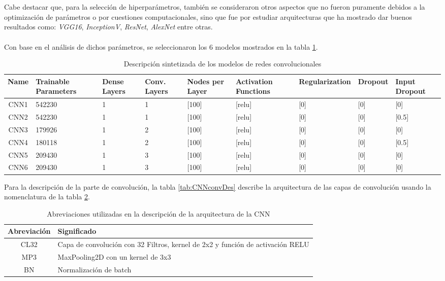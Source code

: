 \documentclass[11pt]{article}
\begin{document}
\\
\\Cabe destacar que, para la selección de hiperparámetros, también se consideraron otros aspectos que no fueron puramente debidos a la optimización de parámetros o por cuestiones computacionales, sino que fue por estudiar arquitecturas que ha mostrado dar buenos resultados como: \textit{VGG16}, \textit{InceptionV}, \textit{ResNet}, \textit{AlexNet}  entre otras.
\\
\\Con base en el análisis de dichos parámetros, se seleccionaron los 6 modelos mostrados en la tabla \ref{tab:CNNdes}. 
\begin{table}[H]
    \centering
    \begin{tabular}{c| p{1.5cm}| p{1.5cm}| p{1.5cm}| p{1.5cm}|  p{1.5cm}|  p{2.2
    cm} | p{1.5cm} | p{1.5cm}}
        \toprule
        Name &  Trainable Parameters &  Dense Layers &  Conv. Layers &  Nodes per Layer & Activation Functions &  Regularization & Dropout & Input Dropout \\
        \midrule
        CNN1 & 542230 & 1 & 1 &  [100] & [relu] & [0] & [0] & [0] \\
        CNN2 & 542230 & 1 & 1 &  [100] & [relu] & [0] & [0] & [0.5] \\
        CNN3 & 179926 & 1 & 2 &  [100] & [relu] & [0] & [0] & [0] \\
        CNN4 & 180118 & 1 & 2 &  [100] & [relu] & [0] & [0] & [0.5] \\
        CNN5 & 209430 & 1 & 3 &  [100] & [relu] & [0] & [0] & [0] \\
        CNN6 & 209430 & 1 & 3 &  [100] & [relu] & [0] & [0] & [0] \\
        \bottomrule
    \end{tabular}        
    \caption{Descripción sintetizada de los modelos de redes convolucionales}
    \label{tab:CNNdes}
\end{table}
Para la descripción de la parte de convolución, la tabla \ref{tab:CNNconvDes} describe la arquitectura de las capas de convolución usando la nomenclatura de la tabla \ref{tab:CNNnom}. 
\begin{table}[H]
    \centering
    \begin{tabular}{c| p{4cm}}
        \toprule
        Abreviación & Significado \\
        \midrule
        CL32 & Capa de convolución con 32 Filtros, kernel de 2x2 y  función de activación RELU \\
        MP3 & MaxPooling2D con un kernel de 3x3 \\
        BN & Normalización de batch \\
        \bottomrule
    \end{tabular}  
    \caption{Abreviaciones utilizadas en la descripción de la arquitectura de la CNN}
    \label{tab:CNNnom} 
\end{table}
\end{document}
